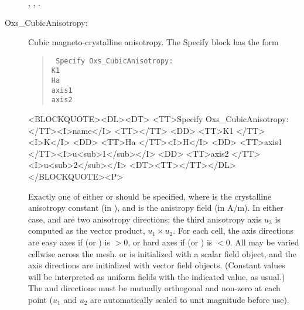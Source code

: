 \begin{description}
\begin{ExampleMifs}
 , , .
\end{ExampleMifs}

\item[Oxs\_CubicAnisotropy:]
%
Cubic magneto-crystalline anisotropy. The Specify block has the form
   \begin{latexonly}
      \begin{quote}\tt
      Specify Oxs\_CubicAnisotropy: \ocb\\
        \bi K1  \\
        \bi Ha  \\
        \bi axis1  \\
        \bi axis2  \\
      \ccb
      \end{quote}
   \end{latexonly}
   \begin{rawhtml}
   <BLOCKQUOTE><DL><DT>
   <TT>Specify Oxs_CubicAnisotropy:</TT><I>name</I> <TT>{</TT>
       <DD> <TT>K1 </TT><I>K</I>
       <DD> <TT>Ha </TT><I>H</I>
       <DD> <TT>axis1 </TT><I>u<sub>1</sub></I>
       <DD> <TT>axis2 </TT><I>u<sub>2</sub></I>
   <DT><TT>}</TT></DL></BLOCKQUOTE><P>
   \end{rawhtml}
  Exactly one of either  or  should be
  specified, where  is the crystalline anisotropy constant
  (in
  ),
  and  is the anistropy field (in A/m).  In either case,
   and  are two anisotropy directions;
  the third anisotropy axis $u_3$ is computed as the vector product,
  $u_1\times u_2$.  For each cell, the axis directions are easy axes if
   (or ) is $>$0, or hard axes if
   (or ) is $<$0.  All may be varied cellwise
  across the mesh.   or  is initialized with a
  scalar field object, and the axis directions are initialized with
  vector field objects.  (Constant values will be interpreted as uniform
  fields with the indicated value, as usual.)  The  and
   directions must be mutually orthogonal and non-zero
  at each point ($u_1$ and $u_2$ are automatically scaled to unit
  magnitude before use).


\end{description}
